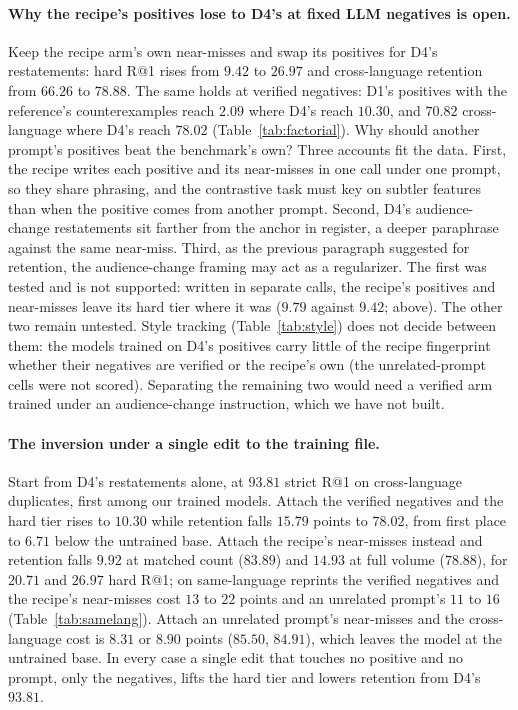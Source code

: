 \paragraph{Why the recipe's positives lose to D4's at fixed LLM negatives is open.}
Keep the recipe arm's own near-misses and swap its positives for D4's restatements: hard R@1 rises from $9.42$ to $26.97$ and cross-language retention from $66.26$ to $78.88$. The same holds at verified negatives: D1's positives with the reference's counterexamples reach $2.09$ where D4's reach $10.30$, and $70.82$ cross-language where D4's reach $78.02$ (Table~\ref{tab:factorial}). Why should another prompt's positives beat the benchmark's own? Three accounts fit the data. First, the recipe writes each positive and its near-misses in one call under one prompt, so they share phrasing, and the contrastive task must key on subtler features than when the positive comes from another prompt. Second, D4's audience-change restatements sit farther from the anchor in register, a deeper paraphrase against the same near-miss. Third, as the previous paragraph suggested for retention, the audience-change framing may act as a regularizer. The first was tested and is not supported: written in separate calls, the recipe's positives and near-misses leave its hard tier where it was ($9.79$ against $9.42$; above). The other two remain untested. Style tracking (Table~\ref{tab:style}) does not decide between them: the models trained on D4's positives carry little of the recipe fingerprint whether their negatives are verified or the recipe's own (the unrelated-prompt cells were not scored). Separating the remaining two would need a verified arm trained under an audience-change instruction, which we have not built.

\paragraph{The inversion under a single edit to the training file.}
Start from D4's restatements alone, at $93.81$ strict R@1 on cross-language duplicates, first among our trained models. Attach the verified negatives and the hard tier rises to $10.30$ while retention falls $15.79$ points to $78.02$, from first place to $6.71$ below the untrained base. Attach the recipe's near-misses instead and retention falls $9.92$ at matched count ($83.89$) and $14.93$ at full volume ($78.88$), for $20.71$ and $26.97$ hard R@1; on same-language reprints the verified negatives and the recipe's near-misses cost $13$ to $22$ points and an unrelated prompt's $11$ to $16$ (Table~\ref{tab:samelang}). Attach an unrelated prompt's near-misses and the cross-language cost is $8.31$ or $8.90$ points ($85.50$, $84.91$), which leaves the model at the untrained base. In every case a single edit that touches no positive and no prompt, only the negatives, lifts the hard tier and lowers retention from D4's $93.81$.

